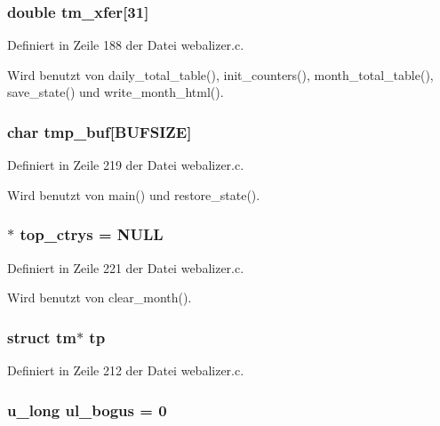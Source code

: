 \subsubsection{\setlength{\rightskip}{0pt plus 5cm}double {\bf tm\_\-xfer}[31]}\label{webalizer_8c_d8577082542e8d61ae9d21b5cdc09de6}




Definiert in Zeile 188 der Datei webalizer.c.

Wird benutzt von daily\_\-total\_\-table(), init\_\-counters(), month\_\-total\_\-table(), save\_\-state() und write\_\-month\_\-html().
\subsubsection{\setlength{\rightskip}{0pt plus 5cm}char {\bf tmp\_\-buf}[BUFSIZE]}\label{webalizer_8c_ee9788649de43fb36bc42d15b1c829ff}




Definiert in Zeile 219 der Datei webalizer.c.

Wird benutzt von main() und restore\_\-state().
\subsubsection{$\ast$ {\bf top\_\-ctrys} = NULL}\label{webalizer_8c_acb9022e3fedc2d14e55e9854fa3cbcf}




Definiert in Zeile 221 der Datei webalizer.c.

Wird benutzt von clear\_\-month().
\subsubsection{\setlength{\rightskip}{0pt plus 5cm}struct tm$\ast$ {\bf tp}}\label{webalizer_8c_7f17db71b666ac0527009f1cd876cac0}




Definiert in Zeile 212 der Datei webalizer.c.
\subsubsection{\setlength{\rightskip}{0pt plus 5cm}u\_\-long {\bf ul\_\-bogus} = 0}\label{webalizer_8c_e29a508fc80a24e71cc41101f6bf9039}




